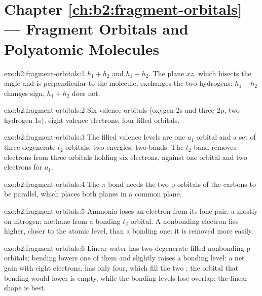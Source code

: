 \section*{Chapter \ref{ch:b2:fragment-orbitals} --- Fragment Orbitals and Polyatomic Molecules}

\begin{solution}{exo:b2:fragment-orbitals:1}
$h_1 + h_2$ and $h_1 - h_2$. The plane $xz$, which bisects the angle and is
perpendicular to the molecule, exchanges the two hydrogens: $h_1 - h_2$ changes
sign, $h_1 + h_2$ does not.
\end{solution}

\begin{solution}{exo:b2:fragment-orbitals:2}
Six valence orbitals (oxygen 2s and three 2p, two hydrogen 1s), eight valence
electrons, four filled orbitals.
\end{solution}

\begin{solution}{exo:b2:fragment-orbitals:3}
The filled valence levels are one $a_1$ orbital and a set of three degenerate $t_2$
orbitals: two energies, two bands. The $t_2$ band removes electrons from three
orbitals holding six electrons, against one orbital and two electrons for $a_1$.
\end{solution}

\begin{solution}{exo:b2:fragment-orbitals:4}
The $\pi$ bond needs the two p orbitals of the carbons to be parallel, which places
both  planes in a common plane.
\end{solution}

\begin{solution}{exo:b2:fragment-orbitals:5}
Ammonia loses an electron from its lone pair, a mostly  on
nitrogen; methane from a bonding $t_2$ orbital. A nonbonding electron lies higher,
closer to the atomic level, than a bonding one: it is removed more easily.
\end{solution}

\begin{solution}{exo:b2:fragment-orbitals:6}
Linear water has two degenerate filled nonbonding p orbitals; bending lowers one of
them and slightly raises a bonding level: a net gain with eight electrons. 
has only four, which fill the two ; the orbital that bending would
lower is empty, while the bonding levels lose overlap: the linear shape is best.
\end{solution}


